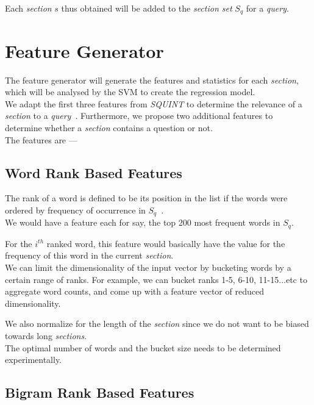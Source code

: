 \documentclass[a4paper,10pt]{report}
\begin{document}
Each \emph{section} $s$ thus obtained will be added to the \emph{section set} $S_{q}$ for a \emph{query}.

\section{Feature Generator}

The feature generator will generate the features and statistics for each \emph{section}, which will be analysed by the SVM to create the regression model. \\

\noindent We adapt the first three features from \emph{SQUINT} to determine the relevance of a \emph{section} to a \emph{query}~\cite{squint}. Furthermore, we propose two additional features to determine whether a \emph{section} contains a question or not. \\

\noindent The features are ---

\subsection {Word Rank Based Features}

The rank of a word is defined to be its position in the list if the words were ordered by frequency of occurrence in \textbf{$S_{q}$}~\cite{squint}. \\

\noindent We would have a feature each for say, the top 200 most frequent words in \textbf{$S_{q}$}. 

For the $i^{th}$ ranked word, this feature would basically have the value for the frequency of this word in the current \emph{section}. \\

\noindent We can limit the dimensionality of the input vector by bucketing words by a certain range of ranks. 
For example, we can bucket ranks 1-5, 6-10, 11-15...etc to aggregate word counts, and come up with a feature vector of reduced dimensionality. 

We also normalize for the length of the \emph{section} since we do not want to be biased towards long \emph{sections}.\\

\noindent The optimal number of words and the bucket size needs to be determined experimentally.

\subsection {Bigram Rank Based Features}
\end{document}
